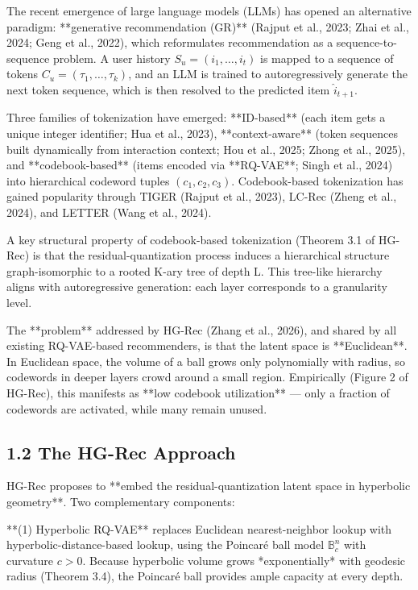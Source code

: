 \documentclass[11pt]{article}
\begin{document}
The recent emergence of large language models (LLMs) has opened an alternative paradigm: **generative recommendation (GR)** (Rajput et al., 2023; Zhai et al., 2024; Geng et al., 2022), which reformulates recommendation as a sequence-to-sequence problem. A user history $S_u = (i_1, \ldots, i_t)$ is mapped to a sequence of tokens $C_u = (\tau_1, \ldots, \tau_k)$, and an LLM is trained to autoregressively generate the next token sequence, which is then resolved to the predicted item $\widehat{i}_{t+1}$.

Three families of tokenization have emerged: **ID-based** (each item gets a unique integer identifier; Hua et al., 2023), **context-aware** (token sequences built dynamically from interaction context; Hou et al., 2025; Zhong et al., 2025), and **codebook-based** (items encoded via **RQ-VAE**; Singh et al., 2024) into hierarchical codeword tuples $(c_1, c_2, c_3)$. Codebook-based tokenization has gained popularity through TIGER (Rajput et al., 2023), LC-Rec (Zheng et al., 2024), and LETTER (Wang et al., 2024).

A key structural property of codebook-based tokenization (Theorem 3.1 of HG-Rec) is that the residual-quantization process induces a hierarchical structure graph-isomorphic to a rooted K-ary tree of depth L. This tree-like hierarchy aligns with autoregressive generation: each layer corresponds to a granularity level.

The **problem** addressed by HG-Rec (Zhang et al., 2026), and shared by all existing RQ-VAE-based recommenders, is that the latent space is **Euclidean**. In Euclidean space, the volume of a ball grows only polynomially with radius, so codewords in deeper layers crowd around a small region. Empirically (Figure 2 of HG-Rec), this manifests as **low codebook utilization** — only a fraction of codewords are activated, while many remain unused.


\subsection{1.2 The HG-Rec Approach}

HG-Rec proposes to **embed the residual-quantization latent space in hyperbolic geometry**. Two complementary components:

**(1) Hyperbolic RQ-VAE** replaces Euclidean nearest-neighbor lookup with hyperbolic-distance-based lookup, using the Poincaré ball model $\mathbb{B}^n_c$ with curvature $c > 0$. Because hyperbolic volume grows *exponentially* with geodesic radius (Theorem 3.4), the Poincaré ball provides ample capacity at every depth.
\end{document}
